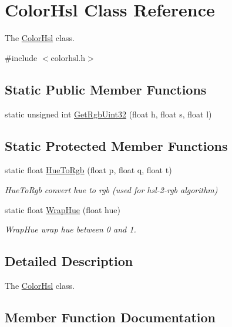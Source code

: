 \hypertarget{classColorHsl}{}\section{Color\+Hsl Class Reference}
\label{classColorHsl}


The \hyperlink{classColorHsl}{Color\+Hsl} class.  




{\ttfamily \#include $<$colorhsl.\+h$>$}

\subsection*{Static Public Member Functions}
\begin{DoxyCompactItemize}
\item 
static unsigned int \hyperlink{classColorHsl_ae9451e6216d6e40eb1d0754e580f4b01}{Get\+Rgb\+Uint32} (float h, float s, float l)
\end{DoxyCompactItemize}
\subsection*{Static Protected Member Functions}
\begin{DoxyCompactItemize}
\item 
static float \hyperlink{classColorHsl_ae5ee64095d7aaebb01498de2180daa9f}{Hue\+To\+Rgb} (float p, float q, float t)
\begin{DoxyCompactList}\small\item\em Hue\+To\+Rgb convert hue to rgb (used for hsl-\/2-\/rgb algorithm) \end{DoxyCompactList}\item 
static float \hyperlink{classColorHsl_a891b3f489be291ab418bffd0cc48f0ee}{Wrap\+Hue} (float hue)
\begin{DoxyCompactList}\small\item\em Wrap\+Hue wrap hue between 0 and 1. \end{DoxyCompactList}\end{DoxyCompactItemize}


\subsection{Detailed Description}
The \hyperlink{classColorHsl}{Color\+Hsl} class. 

\subsection{Member Function Documentation}
\mbox{\label{classColorHsl_ae9451e6216d6e40eb1d0754e580f4b01}} 
